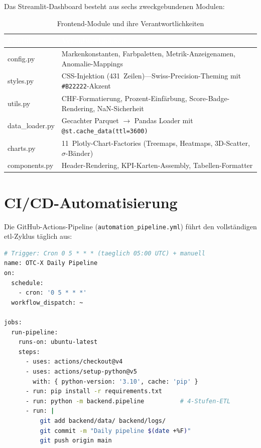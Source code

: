 \documentclass[11pt, a4paper, oneside, openany]{report}
\newcommand{\code}[1]{\texttt{\small\textcolor{DeepNavy}{#1}}}
\begin{document}
Das Streamlit-Dashboard besteht aus sechs zweckgebundenen Modulen:

\begin{table}[H]
\centering
\caption{Frontend-Module und ihre Verantwortlichkeiten}
\label{tab:frontend}
\sffamily\small
\begin{tabularx}{\textwidth}{>{\ttfamily}l X}
  \toprule
  \rowcolor{DeepNavy} \textcolor{white}{\textbf{Modul}} & \textcolor{white}{\textbf{Verantwortlichkeit}} \\
  \midrule
  config.py       & Markenkonstanten, Farbpaletten, Metrik-Anzeigenamen, Anomalie-Mappings \\
  styles.py       & CSS-Injektion (431~Zeilen)\;---\;Swiss-Precision-Theming mit \code{\#B22222}-Akzent \\
  utils.py        & CHF-Formatierung, Prozent-Einfärbung, Score-Badge-Rendering, NaN-Sicherheit \\
  data\_loader.py & Gecachter Parquet $\to$ Pandas Loader mit \code{@st.cache\_data(ttl=3600)} \\
  charts.py       & 11~Plotly-Chart-Factories (Treemaps, Heatmaps, 3D-Scatter, $\sigma$-Bänder) \\
  components.py   & Header-Rendering, KPI-Karten-Assembly, Tabellen-Formatter \\
  \bottomrule
\end{tabularx}
\end{table}

\section{CI/CD-Automatisierung}

Die GitHub-Actions-Pipeline (\code{automation\_pipeline.yml}) führt den vollständigen \gls{etl}-Zyklus täglich aus:

\begin{lstlisting}[language=bash, caption={CI/CD-Ablauf (vereinfacht)}]
# Trigger: Cron 0 5 * * * (taeglich 05:00 UTC) + manuell
name: OTC-X Daily Pipeline
on:
  schedule:
    - cron: '0 5 * * *'
  workflow_dispatch: ~

jobs:
  run-pipeline:
    runs-on: ubuntu-latest
    steps:
      - uses: actions/checkout@v4
      - uses: actions/setup-python@v5
        with: { python-version: '3.10', cache: 'pip' }
      - run: pip install -r requirements.txt
      - run: python -m backend.pipeline          # 4-Stufen-ETL
      - run: |
          git add backend/data/ backend/logs/
          git commit -m "Daily pipeline $(date +%F)"
          git push origin main
\end{lstlisting}
\end{document}

